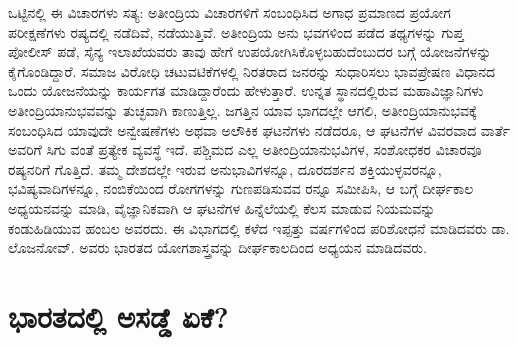 ಒಟ್ಟಿನಲ್ಲಿ ಈ ವಿಚಾರಗಳು ಸತ್ಯ: ಅತೀಂದ್ರಿಯ ವಿಚಾರಗಳಿಗೆ ಸಂಬಂಧಿಸಿದ ಅಗಾಧ ಪ್ರಮಾಣದ ಪ್ರಯೋಗ ಪರೀಕ್ಷಣೆಗಳು ರಷ್ಯದಲ್ಲಿ ನಡೆದಿವೆ, ನಡೆಯುತ್ತಿವೆ. ಅತೀಂದ್ರಿಯ ಅನು ಭವಗಳಿಂದ ಪಡೆದ ತಥ್ಯಗಳನ್ನು ಗುಪ್ತ ಪೋಲೀಸ್ ಪಡೆ, ಸೈನ್ಯ ಇಲಾಖೆಯವರು ತಾವು ಹೇಗೆ ಉಪಯೋಗಿಸಿಕೊಳ್ಳಬಹುದೆಂಬುದರ ಬಗ್ಗೆ ಯೋಜನೆಗಳನ್ನು ಕೈಗೊಂಡಿದ್ದಾರೆ. ಸಮಾಜ ವಿರೋಧಿ ಚಟುವಟಿಕೆಗಳಲ್ಲಿ ನಿರತರಾದ ಜನರನ್ನು ಸುಧಾರಿಸಲು ಭಾವಪ್ರೇಷಣ ವಿಧಾನದ ಒಂದು ಯೋಜನೆಯನ್ನು ಕಾರ್ಯಗತ ಮಾಡಿದ್ದಾರೆಂದು ಹೇಳುತ್ತಾರೆ. ಉನ್ನತ ಸ್ಥಾನದಲ್ಲಿರುವ ಮಹಾವಿಜ್ಞಾನಿಗಳು ಅತೀಂದ್ರಿಯಾನುಭವವನ್ನು ತುಚ್ಛವಾಗಿ ಕಾಣುತ್ತಿಲ್ಲ. ಜಗತ್ತಿನ ಯಾವ ಭಾಗದಲ್ಲೇ ಆಗಲಿ, ಅತೀಂದ್ರಿಯಾನುಭವಕ್ಕೆ ಸಂಬಂಧಿಸಿದ ಯಾವುದೇ ಅನ್ವೇಷಣೆಗಳು ಅಥವಾ ಅಲೌಕಿಕ ಘಟನೆಗಳು ನಡೆದರೂ, ಆ ಘಟನೆಗಳ ವಿವರವಾದ ವಾರ್ತೆ ಅವರಿಗೆ ಸಿಗು ವಂತೆ ಪ್ರತ್ಯೇಕ ವ್ಯವಸ್ಥೆ ಇದೆ. ಪಶ್ಚಿಮದ ಎಲ್ಲ ಅತೀಂದ್ರಿಯಾನುಭವಿಗಳ, ಸಂಶೋಧಕರ ವಿಚಾರವೂ ರಷ್ಯನರಿಗೆ ಗೊತ್ತಿದೆ. ತಮ್ಮ ದೇಶದಲ್ಲೇ ಇರುವ ಅನುಭಾವಿಗಳನ್ನೂ, ದೂರದರ್ಶನ ಶಕ್ತಿಯುಳ್ಳವರನ್ನೂ, ಭವಿಷ್ಯವಾದಿಗಳನ್ನೂ, ನಂಬಿಕೆಯಿಂದ ರೋಗಗಳನ್ನು ಗುಣಪಡಿಸುವವ ರನ್ನೂ ಸಮೀಪಿಸಿ, ಆ ಬಗ್ಗೆ ದೀರ್ಘಕಾಲ ಅಧ್ಯಯನವನ್ನು ಮಾಡಿ, ವೈಜ್ಞಾನಿಕವಾಗಿ ಆ ಘಟನೆಗಳ ಹಿನ್ನೆಲೆಯಲ್ಲಿ ಕೆಲಸ ಮಾಡುವ ನಿಯಮವನ್ನು ಕಂಡುಹಿಡಿಯುವ ಹಂಬಲ ಅವರದು. ಈ ವಿಭಾಗದಲ್ಲಿ ಕಳೆದ ಇಪ್ಪತ್ತು ವರ್ಷಗಳಿಂದ ಪರಿಶೋಧನೆ ಮಾಡಿದವರು ಡಾ. ಲೊಜನೋವ್. ಅವರು ಭಾರತದ ಯೋಗಶಾಸ್ತ್ರವನ್ನು ದೀರ್ಘಕಾಲದಿಂದ ಅಧ್ಯಯನ ಮಾಡಿದವರು.


\section{ಭಾರತದಲ್ಲಿ ಅಸಡ್ಡೆ ಏಕೆ?}

